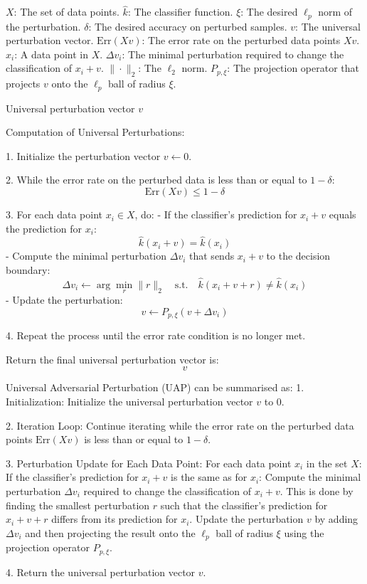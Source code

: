 $X$: The set of data points. 
$\hat{k}$: The classifier function. 
$\xi$: The desired $\ell_p$ norm of the perturbation. 
$\delta$: The desired accuracy on perturbed samples. 
$v$: The universal perturbation vector. 
$\text{Err}(Xv)$: The error rate on the perturbed data points $Xv$. 
$x_i$: A data point in $X$. 
$\Delta v_i$: The minimal perturbation required to change the classification of $x_i + v$. 
$\| \cdot \|_2$: The $\ell_2$ norm. 
$P_{p, \xi}$: The projection operator that projects $v$ onto the $\ell_p$ ball of radius $\xi$.

Universal perturbation vector $v$

Computation of Universal Perturbations:

1. Initialize the perturbation vector $v \leftarrow 0$.

2. While the error rate on the perturbed data is less than or equal to $1 - \delta$:
\[
\text{Err}(Xv) \leq 1 - \delta
\]

3. For each data point $x_i \in X$, do:
    - If the classifier's prediction for $x_i + v$ equals the prediction for $x_i$:
    \[
    \hat{k}(x_i + v) = \hat{k}(x_i)
    \]
        - Compute the minimal perturbation $\Delta v_i$ that sends $x_i + v$ to the decision boundary:
        \[
        \Delta v_i \leftarrow \arg \min_{r} \|r\|_2 \quad \text{s.t.} \quad \hat{k}(x_i + v + r) \neq \hat{k}(x_i)
        \]
        - Update the perturbation:
        \[
        v \leftarrow P_{p, \xi}(v + \Delta v_i)
        \]

4. Repeat the process until the error rate condition is no longer met.

Return the final universal perturbation vector is:
\[
v
\]

Universal Adversarial Perturbation (UAP) can be summarised as:
1. Initialization: 
Initialize the universal perturbation vector $v$ to 0.

2. Iteration Loop: 
Continue iterating while the error rate on the perturbed data points $\text{Err}(Xv)$ is less than or equal to $1 - \delta$.

3. Perturbation Update for Each Data Point: 
For each data point $x_i$ in the set $X$: 
If the classifier's prediction for $x_i + v$ is the same as for $x_i$: 
Compute the minimal perturbation $\Delta v_i$ required to change the classification of $x_i + v$. This is done by finding the smallest perturbation $r$ such that the classifier's prediction for $x_i + v + r$ differs from its prediction for $x_i$. 
Update the perturbation $v$ by adding $\Delta v_i$ and then projecting the result onto the $\ell_p$ ball of radius $\xi$ using the projection operator $P_{p, \xi}$.

4. Return the universal perturbation vector $v$.
